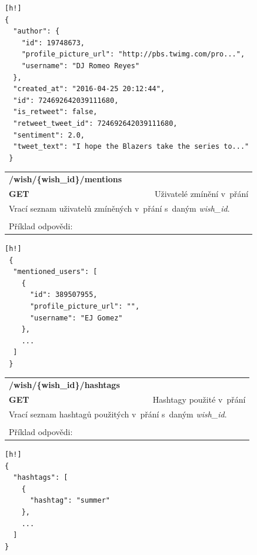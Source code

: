 \documentclass[thesis=B,czech]{FITthesis}[2012/06/26]
\begin{document}
\begin{lstlisting}[nolol=true][h!]
{
  "author": {
    "id": 19748673,
    "profile_picture_url": "http://pbs.twimg.com/pro...",
    "username": "DJ Romeo Reyes"
  },
  "created_at": "2016-04-25 20:12:44",
  "id": 724692642039111680,
  "is_retweet": false,
  "retweet_tweet_id": 724692642039111680,
  "sentiment": 2.0,
  "tweet_text": "I hope the Blazers take the series to..."
 }
\end{lstlisting} 

\begin{table}[h]
\begin{tabular}{llllr}
\rowcolor[HTML]{EFEFEF}
\large \textbf{/wish/\{wish\_id\}/mentions}        &         &                 &        & \multicolumn{1}{l}{}                \\
\rowcolor[HTML]{EFEFEF}
\textbf{GET}          &         &                 &        & Uživatelé zmínění v~přání                        \\
\multicolumn{5}{l}{\parbox[t]{12.8cm}{Vrací seznam uživatelů zmíněných v~přání s~daným \textit{wish\_id}.}  } \\    
 & & & & \\
 Příklad odpovědi:
\end{tabular}
\end{table}

\begin{lstlisting}[nolol=true][h!]
 {
  "mentioned_users": [
    {
      "id": 389507955,
      "profile_picture_url": "",
      "username": "EJ Gomez"
    },
    ...
  ]
 }
\end{lstlisting} 

\begin{table}[h]
\begin{tabular}{llllr}
\rowcolor[HTML]{EFEFEF}
\large \textbf{/wish/\{wish\_id\}/hashtags}        &         &                 &        & \multicolumn{1}{l}{}                \\
\rowcolor[HTML]{EFEFEF}
\textbf{GET}          &         &                 &        & Hashtagy použité v~přání                        \\
\multicolumn{5}{l}{\parbox[t]{12.8cm}{Vrací seznam hashtagů použitých v~přání s~daným \textit{wish\_id}.}  } \\   
 & & & & \\
 Příklad odpovědi: 
\end{tabular}
\end{table}

\noindent\begin{minipage}{\textwidth}
\begin{lstlisting}[nolol=true][h!]
{
  "hashtags": [
    {
      "hashtag": "summer"
    },
    ...
  ]
}
\end{lstlisting} 
\end{minipage}
\end{document}
